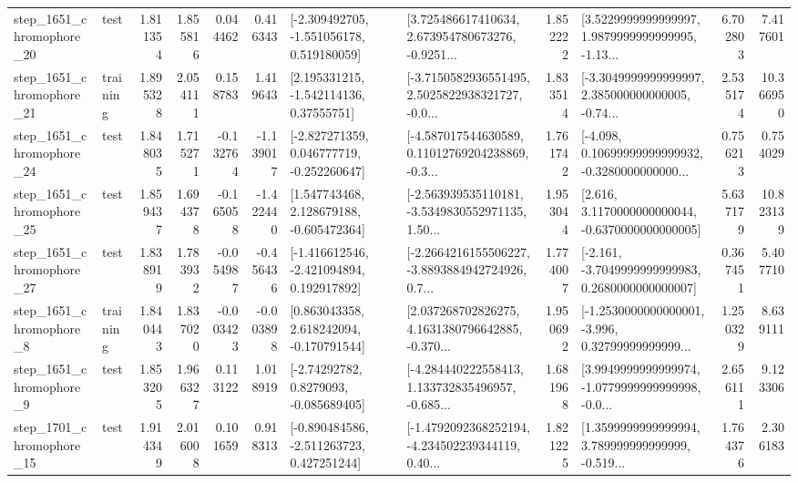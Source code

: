 \begin{tabular}{llrrrrllrlrr}
 step\_1651\_chromophore\_20 &      test &      1.811354 &    1.855816 &      0.044462 &  0.416343 &   [-2.309492705, -1.551056178, 0.519180059] &  [3.725486617410634, 2.673954780673276, -0.9251... &       1.852222 &  [3.5229999999999997, 1.9879999999999995, -1.13... &            6.702803 &          7.417601 \\
 step\_1651\_chromophore\_21 &  training &      1.895328 &    2.054111 &      0.158783 &  1.419643 &     [2.195331215, -1.542114136, 0.37555751] &  [-3.7150582936551495, 2.5025822938321727, -0.0... &       1.833514 &  [-3.3049999999999997, 2.385000000000005, -0.74... &            2.535174 &         10.366950 \\
 step\_1651\_chromophore\_24 &      test &      1.848035 &    1.715271 &     -0.132764 & -1.139017 &   [-2.827271359, 0.046777719, -0.252260647] &  [-4.587017544630589, 0.11012769204238869, -0.3... &       1.761742 &  [-4.098, 0.10699999999999932, -0.3280000000000... &            0.756213 &          0.754029 \\
 step\_1651\_chromophore\_25 &      test &      1.859437 &    1.694378 &     -0.165058 & -1.422440 &    [1.547743468, 2.128679188, -0.605472364] &  [-2.563939535110181, -3.5349830552971135, 1.50... &       1.953044 &   [2.616, 3.1170000000000044, -0.6370000000000005] &            5.637179 &         10.823139 \\
 step\_1651\_chromophore\_27 &      test &      1.838919 &    1.783932 &     -0.054987 & -0.456436 &   [-1.416612546, -2.421094894, 0.192917892] &  [-2.2664216155506227, -3.8893884942724926, 0.7... &       1.774007 &  [-2.161, -3.7049999999999983, 0.2680000000000007] &            0.367451 &          5.407710 \\
  step\_1651\_chromophore\_8 &  training &      1.840443 &    1.837020 &     -0.003423 & -0.003898 &    [0.863043358, 2.618242094, -0.170791544] &  [2.037268702826275, 4.1631380796642885, -0.370... &       1.950692 &  [-1.2530000000000001, -3.996, 0.32799999999999... &            1.250329 &          8.639111 \\
  step\_1651\_chromophore\_9 &      test &      1.853205 &    1.966327 &      0.113122 &  1.018919 &      [-2.74292782, 0.8279093, -0.085689405] &  [-4.284440222558413, 1.133732835496957, -0.685... &       1.681968 &  [3.9949999999999974, -1.0779999999999998, -0.0... &            2.656111 &          9.123306 \\
 step\_1701\_chromophore\_15 &      test &      1.914349 &    2.016008 &      0.101659 &  0.918313 &   [-0.890484586, -2.511263723, 0.427251244] &  [-1.4792092368252194, -4.234502239344119, 0.40... &       1.821225 &  [1.3599999999999994, 3.789999999999999, -0.519... &            1.764376 &          2.306183 \\

\end{tabular}
